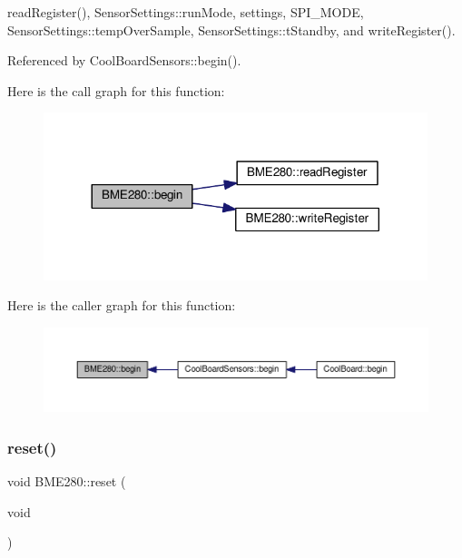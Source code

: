 read\+Register(), Sensor\+Settings\+::run\+Mode, settings, S\+P\+I\+\_\+\+M\+O\+DE, Sensor\+Settings\+::temp\+Over\+Sample, Sensor\+Settings\+::t\+Standby, and write\+Register().



Referenced by Cool\+Board\+Sensors\+::begin().

Here is the call graph for this function\+:\nopagebreak
\begin{figure}[H]
\begin{center}
\leavevmode
\includegraphics[width=317pt]{df/dcf/class_b_m_e280_a994c102f010547f9c740a338ef9905c7_cgraph}
\end{center}
\end{figure}
Here is the caller graph for this function\+:\nopagebreak
\begin{figure}[H]
\begin{center}
\leavevmode
\includegraphics[width=350pt]{df/dcf/class_b_m_e280_a994c102f010547f9c740a338ef9905c7_icgraph}
\end{center}
\end{figure}
\mbox{\label{class_b_m_e280_aeec5deb6daace6ae390108b4210e9df7}} 
\subsubsection{\texorpdfstring{reset()}{reset()}}
{\footnotesize\ttfamily void B\+M\+E280\+::reset (\begin{DoxyParamCaption}\item[{void}]{ }\end{DoxyParamCaption})}



